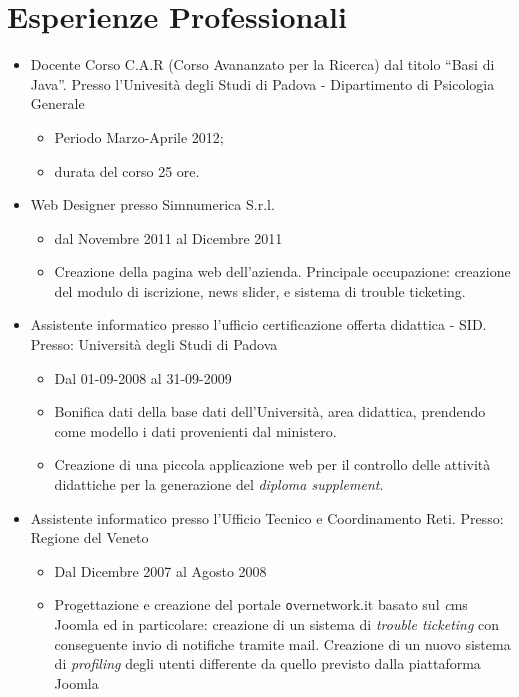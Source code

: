 \documentclass[pdftex,a4paper,12pt,twoside,titlepage,italian,openright]{article}
\begin{document}
\section*{Esperienze Professionali}
\begin{itemize}
	\item Docente Corso C.A.R (Corso Avananzato per la Ricerca) dal titolo ``Basi di Java''.
	Presso l'Univesità degli Studi di Padova - Dipartimento di Psicologia Generale
	\begin{itemize}
		\item Periodo Marzo-Aprile 2012;
		\item durata del corso 25 ore.
	\end{itemize}
	\item Web Designer presso Simnumerica S.r.l.
	\begin{itemize}
		\item dal Novembre 2011 al Dicembre 2011
		\item Creazione della pagina web dell'azienda. Principale occupazione: creazione del modulo di 
		iscrizione, news slider, e sistema di trouble ticketing.
	\end{itemize}
	\item Assistente informatico presso l'ufficio certificazione offerta didattica - SID.
	Presso: Università degli Studi di Padova
	\begin{itemize}
		\item Dal 01-09-2008 al 31-09-2009 
		\item Bonifica dati della base dati dell'Università, area didattica, prendendo come 
		modello i dati provenienti dal ministero.
		\item Creazione di una piccola applicazione web per il controllo delle attività didattiche
		per la generazione del \textit{diploma supplement}.
	\end{itemize}
	\item Assistente informatico presso l'Ufficio Tecnico e Coordinamento Reti. Presso:
	Regione del Veneto
	\begin{itemize}
		\item Dal Dicembre 2007 al Agosto 2008
		\item Progettazione e creazione del portale {\texttt overnetwork.it} basato sul {\textit cms Joomla}
		ed in particolare: creazione di un sistema di \textit{trouble ticketing} con conseguente 
		invio di notifiche tramite mail. Creazione di un nuovo sistema di \textit{profiling}
		degli utenti differente da quello previsto dalla piattaforma Joomla
	\end{itemize}
\end{itemize}
\end{document}
